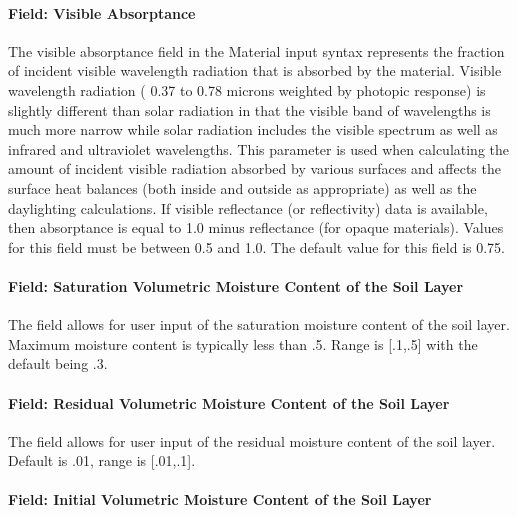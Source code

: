 \paragraph{Field: Visible Absorptance}\label{field-visible-absorptance-2}

The visible absorptance field in the Material input syntax represents the fraction of incident visible wavelength radiation that is absorbed by the material. Visible wavelength radiation ( 0.37 to 0.78 microns weighted by photopic response) is slightly different than solar radiation in that the visible band of wavelengths is much more narrow while solar radiation includes the visible spectrum as well as infrared and ultraviolet wavelengths. This parameter is used when calculating the amount of incident visible radiation absorbed by various surfaces and affects the surface heat balances (both inside and outside as appropriate) as well as the daylighting calculations. If visible reflectance (or reflectivity) data is available, then absorptance is equal to 1.0 minus reflectance (for opaque materials). Values for this field must be between 0.5 and 1.0. The default value for this field is 0.75.

\paragraph{Field: Saturation Volumetric Moisture Content of the Soil Layer}\label{field-saturation-volumetric-moisture-content-of-the-soil-layer}

The field allows for user input of the saturation moisture content of the soil layer. Maximum moisture content is typically less than .5. Range is {[}.1,.5{]} with the default being .3.

\paragraph{Field: Residual Volumetric Moisture Content of the Soil Layer}\label{field-residual-volumetric-moisture-content-of-the-soil-layer}

The field allows for user input of the residual moisture content of the soil layer. Default is .01, range is {[}.01,.1{]}.

\paragraph{Field: Initial Volumetric Moisture Content of the Soil Layer}\label{field-initial-volumetric-moisture-content-of-the-soil-layer}

